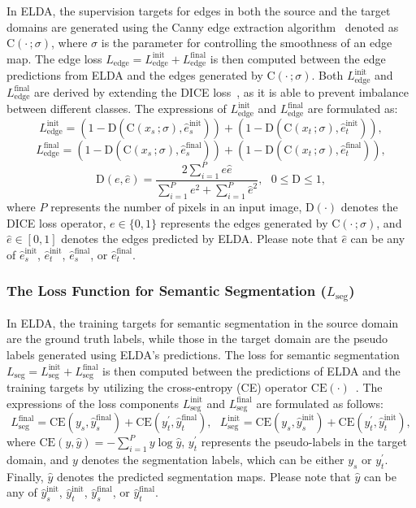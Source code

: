 \documentclass{bmvc2k}
\newcommand{\xs}{x_s}
\newcommand{\ys}{y_s}
\newcommand{\xt}{x_t}
\newcommand{\ypt}{y^{'}_t}
\newcommand{\C}{\text{C}}
\newcommand{\D}{\text{D}}
\newcommand{\CE}{\text{CE}}
\newcommand{\eshatinit}{\hat{e}_s^{\text{init}}}
\newcommand{\ethatinit}{\hat{e}_t^{\text{init}}}
\newcommand{\yshatinit}{\hat{y}_s^{\text{init}}}
\newcommand{\ythatinit}{\hat{y}_t^{\text{init}}}
\newcommand{\eshatfinal}{\hat{e}_s^{\text{final}}}
\newcommand{\ethatfinal}{\hat{e}_t^{\text{final}}}
\newcommand{\yshatfinal}{\hat{y}_s^{\text{final}}}
\newcommand{\ythatfinal}{\hat{y}_t^{\text{final}}}
\newcommand{\Lseginit}{L_{\text{seg}}^{\text{init}}}
\newcommand{\Ledgeinit}{L_{\text{edge}}^{\text{init}}}
\newcommand{\Lsegfinal}{L_{\text{seg}}^{\text{final}}}
\newcommand{\Ledgefinal}{L_{\text{edge}}^{\text{final}}}
\newcommand{\Lseg}{L_{\text{seg}}}
\newcommand{\Ledge}{L_{\text{edge}}}
\begin{document}
In ELDA, the supervision targets for edges in both the source and the target domains are generated using the Canny edge extraction algorithm~\cite{canny1986} denoted as $\C(\cdot\,;\sigma)$, where $\sigma$ is the parameter for controlling the smoothness of an edge map. The edge loss $\Ledge = \Ledgeinit +\Ledgefinal$ is then computed between the edge predictions from ELDA and the edges generated by $\C(\cdot\,;\sigma)$. Both $\Ledgeinit$ and $\Ledgefinal$ are derived by extending the DICE loss~\cite{milletari2016vnet}, as it is able to prevent imbalance between different classes.
The expressions of $\Ledgeinit$ and $\Ledgefinal$ are formulated as:
\begin{equation}
    \Ledgeinit = (1 - \D(\C(\xs\,;\sigma), \eshatinit)) + (1 - \D(\C(\xt\,;\sigma), \ethatinit)),
\end{equation}
\begin{equation}
    \Ledgefinal = (1 - \D(\C(\xs\,;\sigma), \eshatfinal)) + (1 - \D(\C(\xt\,;\sigma), \ethatfinal)),
\end{equation}
\begin{equation}
\D(e, \hat{e})= \frac{2 \sum_{i=1}^P e \hat{e}}{\sum_{i=1}^P e^2 + \sum_{i=1}^P \hat{e}^2 },\,\,\,\, 0\leq \D \leq 1,
\end{equation}
where $P$ represents the number of pixels in an input image, $\D(\cdot)$ denotes the DICE loss operator, $e\in\{0,1\}$ represents the edges generated by $\C(\cdot\,;\sigma)$, and $\hat{e}\in[0,1]$ denotes the edges predicted by ELDA. Please note that $\hat{e}$ can be any of  $\eshatinit$, $\ethatinit$, $\eshatfinal$, or $\ethatfinal$.




\subsubsection{The Loss Function for Semantic Segmentation ($\Lseg$)}
In ELDA, the training targets for semantic segmentation in the source domain are the ground truth labels, while those in the target domain are the pseudo labels generated using ELDA's predictions. The loss for semantic segmentation $\Lseg = \Lseginit + \Lsegfinal$ is then computed between the predictions of ELDA and the training targets by utilizing the cross-entropy (CE) operator $\CE(\cdot)$~\cite{DBLP:journals/corr/abs-1805-07836}. The expressions of the loss components $\Lseginit$ and $\Lsegfinal$ are formulated as follows:
\begin{equation}
    \Lsegfinal = \CE(\ys, \yshatfinal)+ \CE(\ypt, \ythatfinal),\,\,\,\,
    \Lseginit = \CE(\ys, \yshatinit)+ \CE(\ypt, \ythatinit),
\end{equation}
where $\CE(y, \hat{y})= - \sum_{i=1}^P y \log \hat{y}$, $\ypt$ represents the pseudo-labels in the target domain, and $y$ denotes the segmentation labels, which can be either $\ys$ or $\ypt$. Finally, $\hat{y}$ denotes the predicted segmentation maps. Please note that $\hat{y}$ can be any of $\yshatinit$, $\ythatinit$,  $\yshatfinal$, or $\ythatfinal$.
\end{document}
